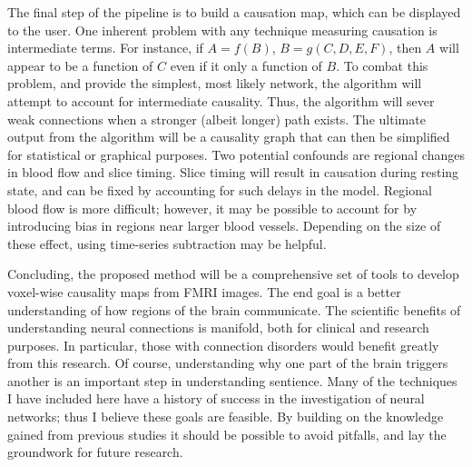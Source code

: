 \documentclass[12pt]{article}
\begin{document}
The final step of the pipeline is to build a causation map, which can be displayed
to the user. One inherent problem with any technique measuring causation is 
intermediate terms. For instance, if $A = f(B)$, $B = g(C, D, E, F)$, then
$A$ will appear to be a function of $C$ even if it only a function of $B$.
To combat this problem, and
provide the simplest, most likely network, the algorithm will attempt to account
for intermediate causality. Thus, the algorithm will sever weak connections
when a stronger (albeit longer) path exists. The ultimate output from the algorithm
will be a 
causality graph that can then be simplified for statistical or graphical purposes.
Two potential confounds are regional changes in blood flow and slice timing.
Slice timing will result in causation during resting state, and can be fixed by
accounting for such delays in the model. 
Regional blood flow is more difficult; however, it may be possible to account for
by introducing bias in regions near larger blood vessels. 
Depending on the size of these effect, using time-series subtraction 
may be helpful. 

\bigskip
Concluding, the proposed method will be a comprehensive set of tools to develop
voxel-wise causality maps from FMRI images. The end goal is
a better understanding of how regions of the brain communicate. 
The scientific benefits of understanding neural connections is manifold, both for
clinical and research purposes. In particular, those with connection disorders 
would benefit greatly from this research.
Of course, understanding why one part of the brain triggers another is 
an important step in understanding sentience.
Many of the techniques I have included here have a history of success in the
investigation of neural networks; thus I believe these goals are feasible. 
By building on the knowledge gained from previous studies it
should be possible to avoid pitfalls, and lay the groundwork for future research.

\small


\end{document}

